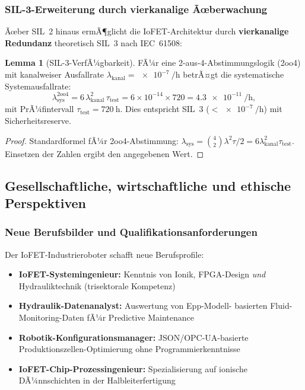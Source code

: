 ﻿\documentclass[a4paper,12pt]{scrreprt}
\theoremstyle{definition}
\newtheorem{lemma}{Lemma}[section]
\begin{document}
\subsubsection{SIL-3-Erweiterung durch vierkanalige Ãœberwachung}

Ãœber SIL~2 hinaus ermÃ¶glicht die IoFET-Architektur durch
\textbf{vierkanalige Redundanz} theoretisch SIL~3 nach IEC~61508:

\begin{lemma}[SIL-3-VerfÃ¼gbarkeit]
\label{lem:sil3}
FÃ¼r eine 2-aus-4-Abstimmungslogik (2oo4) mit kanalweiser
Ausfallrate $\lambda_{\text{kanal}} = \SI{e-7}{\per\hour}$
betrÃ¤gt die systematische Systemausfallrate:
\begin{equation}
  \lambda_{\text{sys}}^{\text{2oo4}}
  = 6 \,\lambda_{\text{kanal}}^2 \,\tau_{\text{test}}
  = 6 \times 10^{-14} \times 720
  = \SI{4.3e-11}{\per\hour},
\end{equation}
mit PrÃ¼fintervall $\tau_{\text{test}} = \SI{720}{\hour}$.
Dies entspricht SIL~3 ($< \SI{e-7}{\per\hour}$) mit Sicherheitsreserve.
\end{lemma}

\begin{proof}
Standardformel fÃ¼r 2oo4-Abstimmung: $\lambda_{\text{sys}} =
\binom{4}{2} \lambda^2 \tau / 2 =
6 \lambda_{\text{kanal}}^2 \tau_{\text{test}}$.
Einsetzen der Zahlen ergibt den angegebenen Wert.
\end{proof}

\subsection{Gesellschaftliche, wirtschaftliche und ethische Perspektiven}

\subsubsection{Neue Berufsbilder und Qualifikationsanforderungen}

Der IoFET-Industrieroboter schafft neue Berufsprofile:

\begin{itemize}
  \item \textbf{IoFET-Systemingenieur:} Kenntnis von Ionik,
        FPGA-Design \emph{und} Hydrauliktechnik (trisektorale Kompetenz)
  \item \textbf{Hydraulik-Datenanalyst:} Auswertung von Epp-Modell-
        basierten Fluid-Monitoring-Daten fÃ¼r Predictive Maintenance
  \item \textbf{Robotik-Konfigurations\-manager:} JSON/OPC-UA-basierte
        Produktionszellen-Optimierung ohne Programmierkenntnisse
  \item \textbf{IoFET-Chip-Prozess\-ingenieur:} Spezialisierung auf
        ionische DÃ¼nnschichten in der Halbleiterfertigung
\end{itemize}
\end{document}
